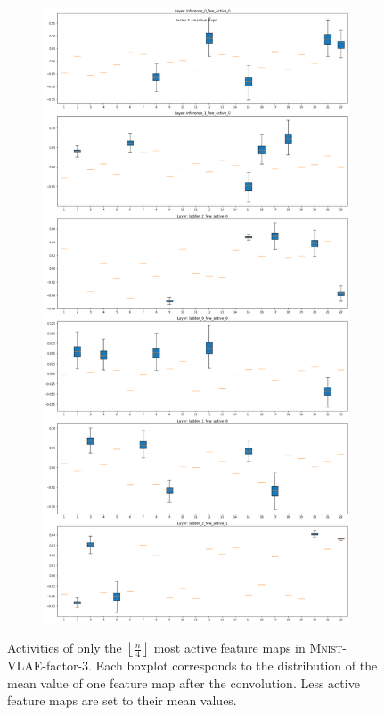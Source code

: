 \begin{figure}
    \centering
    \begin{subfigure}{\textwidth}
        \centering
        \includegraphics[height=.8\textheight]{images/sparseness/encoder_fm3_fms_inactive.png}
    \end{subfigure}
    \caption[\textsc{Mnist}-VLAE-factor-3: Most Active Feature Maps]{Activities of only the $\left \lfloor \frac{n}{4} \right \rfloor$ most active feature maps in \textsc{Mnist}-\ac{VLAE}-factor-3.
    Each boxplot corresponds to the distribution of the mean value of one feature map after the convolution.
    Less active feature maps are set to their mean values.
    }
    \label{fig:fm_activities_sparseness_inactive}
\end{figure}


